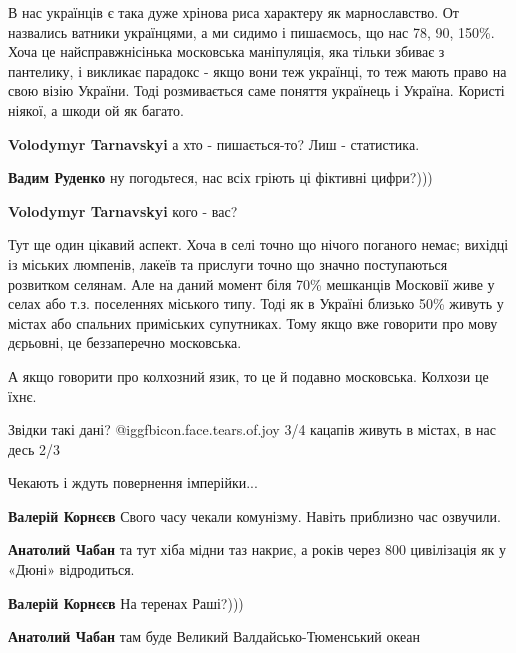 \begin{itemize}
\begin{itemize}

В нас українців є така дуже хрінова риса характеру як марнославство. От
назвались ватники українцями, а ми сидимо і пишаємось, що нас 78, 90, 150\%.
Хоча це найсправжнісінька московська маніпуляція, яка тільки збиває з
пантелику, і викликає парадокс - якщо вони теж українці, то теж мають право на
свою візію України. Тоді розмивається саме поняття українець і Україна. Користі
ніякої, а шкоди ой як багато.


\textbf{Volodymyr Tarnavskyi} а хто - пишається-то? Лиш - статистика.

\textbf{Вадим Руденко} ну погодьтеся, нас всіх гріють ці фіктивні цифри?)))

\textbf{Volodymyr Tarnavskyi} кого - вас?
\end{itemize} %


Тут ще один цікавий аспект. Хоча в селі точно що нічого поганого немає; вихідці
із міських люмпенів, лакеїв та прислуги точно що значно поступаються розвитком
селянам. Але на даний момент біля 70\% мешканців Московії живе у селах або т.з.
поселеннях міського типу. Тоді як в Україні близько 50\% живуть у містах або
спальних приміських супутниках. Тому якщо вже говорити про мову дєрьовні, це
беззаперечно московська.

\begin{itemize} %
А якщо говорити про колхозний язик, то це й подавно московська. Колхози це їхнє.

Звідки такі дані?  @igg{fbicon.face.tears.of.joy}  3/4 кацапів живуть в містах, в нас десь 2/3
\end{itemize} %

Чекають і ждуть повернення імперійки...

\begin{itemize} %
\textbf{Валерій Корнєєв} Свого часу чекали комунізму. Навіть приблизно час озвучили.

\textbf{Анатолий Чабан} та тут хіба мідни таз накриє, а років через 800 цивілізація як у «Дюні» відродиться.

\textbf{Валерій Корнєєв} На теренах Раші?)))

\textbf{Анатолий Чабан} там буде Великий Валдайсько-Тюменський океан
\end{itemize} %


\end{itemize}
